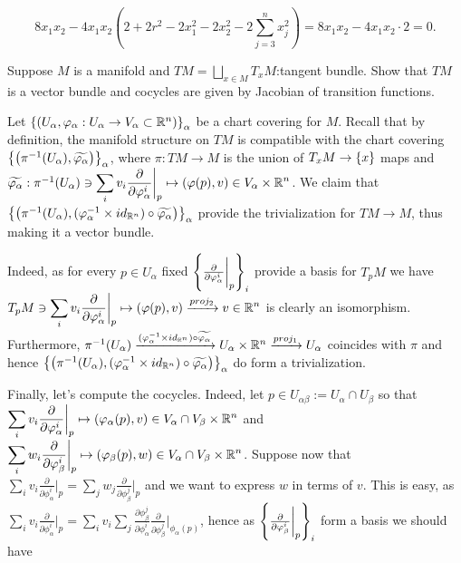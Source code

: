 \documentclass[8pt]{article} %
\newcommand{\myprobshort}[2]{\begin{myprob}[#1]#2\end{myprob}}
\begin{document}
\[8x_1x_2-4x_1x_2(2+2r^2-2x_1^2-2x_2^2-2\sum_{ j=3}^nx_j^2)=8x_1x_2-4x_1x_2\cdot2=0.\]
\myprobshort{ April 21, Example 3.2.3 }{Suppose $M$ is a manifold and $TM=\bigsqcup_{ x\in M }T_xM$:tangent bundle. Show
that $TM$ is a vector bundle and cocycles are given by Jacobian of transition functions.}%
Let $\left\{\left( U_\alpha,\varphi_\alpha:U_\alpha\to V_\alpha\subset\mathbb{R}^n \right)\right\}_\alpha$ be a chart covering for $M$.
Recall that by definition, the manifold structure on $TM$ is compatible with the chart covering 
$\left\{ \left(\pi^{ -1 }(U_\alpha),\widetilde{ \varphi_\alpha }  \right) \right\}_\alpha$, where $\pi:TM\to M$ is
the union of $T_xM\to\left\{ x \right\}$ maps and $\widetilde{\phi_\alpha}:\pi^{ -1 }(U_\alpha)\ni
\sum_iv_i\frac{ \partial }
{ \partial \phi_\alpha^i }\bigg|_p\mapsto
(\phi(p),v)\in V_\alpha\times\R^n$. We claim that 
$\left\{ \left(\pi^{ -1 }(U_\alpha),(\varphi_\alpha^{ -1 }\times id_{ \mathbb{R}^n })\circ\widetilde{ \varphi_\alpha }  \right) \right\}_\alpha$ provide the trivialization for $TM\to M$, thus making it a vector bundle.\par
Indeed, as for every $p\in U_\alpha$ fixed $\left\{ \frac{\partial}{ \partial \varphi_\alpha^i }\bigg|_p \right\}_i$ provide a basis 
for $T_pM$ we have $T_pM\ni\sum_iv_i\frac{ \partial }
{ \partial \phi_\alpha^i }\bigg|_p\mapsto (\phi(p),v)\xrightarrow{ proj_2 }v\in\R^n$ is clearly an isomorphism. Furthermore,
$\pi^{ -1 }(U_\alpha)\xrightarrow{ (\varphi_\alpha^{ -1 }\times id_{ \mathbb{R}^n })\circ\widetilde{\varphi_\alpha }}U_\alpha\times\mathbb{R}^n\xrightarrow
{proj_1}U_\alpha$ coincides with $\pi$ and hence 
$\left\{ \left(\pi^{ -1 }(U_\alpha),(\varphi_\alpha^{ -1 }\times id_{ \mathbb{R}^n })\circ\widetilde{ \varphi_\alpha }  \right) \right\}_\alpha$ do form
a trivialization.\par
Finally, let's compute the cocycles. Indeed, let $p\in U_{ \alpha\beta }:=U_\alpha\cap U_\beta$ so
that
$\sum_iv_i\frac{ \partial }{ \partial \phi_\alpha^i }\bigg|_p
\mapsto(\phi_\alpha(p),v)\in V_{ \alpha }\cap V_{ \beta }\times\R^n$ and
$\sum_iw_i\frac{ \partial }
{ \partial \phi_\beta^i }\bigg|_p\mapsto(\phi_\beta(p),w)\in V_{ \alpha }\cap V_{ \beta }\times\R^n$.
Suppose now that 
$\sum_iv_i\frac{ \partial }{ \partial \phi_\alpha^i }\bigg|_p=
\sum_jw_j\frac{ \partial }{ \partial \phi_\beta^j }\bigg|_p$ and we want to express $w$ in terms of $v$.
This is easy, as $\sum_iv_i\frac{ \partial }{ \partial \phi_\alpha^i }\bigg|_p=\sum_iv_i\sum_j\frac{ \partial\phi_\beta^j }{ \partial
\phi_\alpha^i}\frac{ \partial }{ \partial \phi_\beta^j }\bigg|_{ \phi_\alpha(p) }$, hence as 
$\left\{ \frac{\partial}{ \partial \varphi_\beta^i }\bigg|_p \right\}_i$ form a basis we should have
\end{document}
